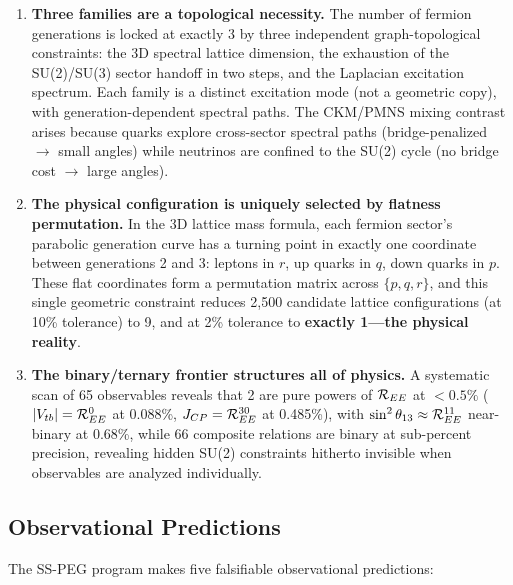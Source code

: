 \begin{enumerate}
\item \textbf{Three families are a topological necessity.} The number of fermion generations is locked at exactly 3 by three independent graph-topological constraints: the 3D spectral lattice dimension, the exhaustion of the SU(2)/SU(3) sector handoff in two steps, and the Laplacian excitation spectrum. Each family is a distinct excitation mode (not a geometric copy), with generation-dependent spectral paths. The CKM/PMNS mixing contrast arises because quarks explore cross-sector spectral paths (bridge-penalized $\to$ small angles) while neutrinos are confined to the SU(2) cycle (no bridge cost $\to$ large angles).

\item \textbf{The physical configuration is uniquely selected by flatness permutation.} In the 3D lattice mass formula, each fermion sector's parabolic generation curve has a turning point in exactly one coordinate between generations 2 and 3: leptons in $r$, up quarks in $q$, down quarks in $p$. These flat coordinates form a permutation matrix across $\{p, q, r\}$, and this single geometric constraint reduces 2,500 candidate lattice configurations (at 10\% tolerance) to 9, and at 2\% tolerance to \textbf{exactly 1---the physical reality}.

\item \textbf{The binary/ternary frontier structures all of physics.} A systematic scan of 65 observables reveals that 2 are pure powers of $\mathcal{R}_{EE}$ at $< 0.5\%$ ($|V_{tb}| = \mathcal{R}_{EE}^0$ at 0.088\%, $J_{CP} = \mathcal{R}_{EE}^{30}$ at 0.485\%), with $\sin^2\theta_{13} \approx \mathcal{R}_{EE}^{11}$ near-binary at 0.68\%, while 66 composite relations are binary at sub-percent precision, revealing hidden SU(2) constraints hitherto invisible when observables are analyzed individually.
\end{enumerate}

\subsection{Observational Predictions}\label{sec:observational_predictions}

The SS-PEG program makes five falsifiable observational predictions:

